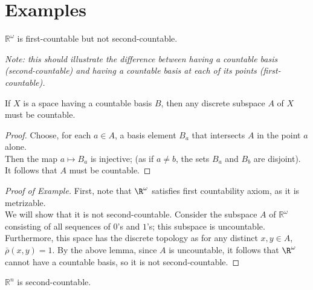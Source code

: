 \documentclass[11pt]{article}
\begin{document}
    

\section{Examples}

\begin{eg}$\mathbb{R}^\omega$ is first-countable but not second-countable.\end{eg}

\textit{Note: this should illustrate the difference between having a countable basis (second-countable) and having a countable basis at each of its points (first-countable).}

\begin{lemma*}
If $X$ is a space having a countable basis $B$, then any discrete subspace $A$ of $X$ must be countable.
\end{lemma*}

\begin{proof}
Choose, for each $a \in A$, a basis element $B_a$ that intersects $A$ in the point $a$ alone. \\

Then the map $a \mapsto B_a$ is injective; (as if $a \neq b$, the sets $B_a$ and $B_b$ are disjoint). It follows that $A$ must be countable.
\end{proof}

\begin{proof}[Proof of Example]
First, note that $\R^\omega$ satisfies first countability axiom, as it is metrizable. \\

We will show that it is not second-countable. Consider the subspace $A$ of $\mathbb{R}^\omega$ consisting of all sequences of $0$'s and $1$'s; this subspace is uncountable. \\

Furthermore, this space has the discrete topology as for any distinct $x, y \in A$, $\bar{\rho}(x, y) = 1$. By the above lemma, since $A$ is uncountable, it follows that $\R^\omega$ cannot have a countable basis, so it is not second-countable.
\end{proof}




\begin{eg} $\mathbb{R}^n$ is second-countable. \end{eg}
\end{document}
